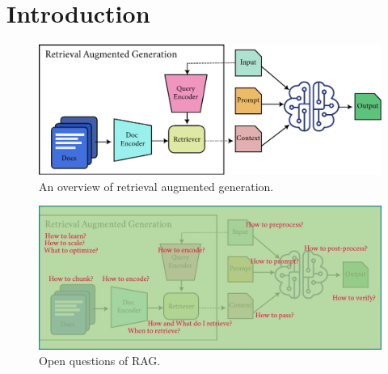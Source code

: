 \section{Introduction}
\label{sec:rag_intro}

\begin{figure}[h]
	\centering
	\includegraphics[scale=0.5]{./images/nlp/rag.pdf}
	\caption{An overview of retrieval augmented generation.}
	\label{fig:rag}
\end{figure}

\begin{figure}[h]
	\centering
	\includegraphics[scale=0.5]{./images/nlp/rag_questions.pdf}
	\caption{Open questions of RAG.}
	\label{fig:rag_questions}
\end{figure}
